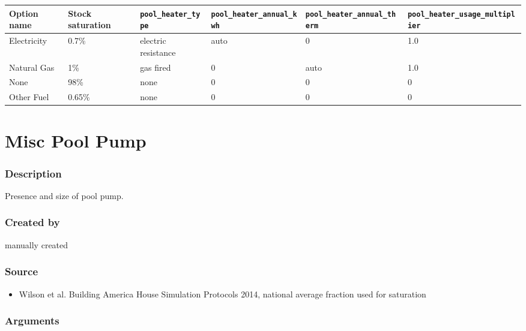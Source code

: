 \begin{longtable}[]{@{}llllll@{}}
\toprule\noalign{}
Option name & Stock saturation & \texttt{pool\_heater\_type} &
\texttt{pool\_heater\_annual\_kwh} &
\texttt{pool\_heater\_annual\_therm} &
\texttt{pool\_heater\_usage\_multiplier} \\
\midrule\noalign{}
\endhead
\bottomrule\noalign{}
\endlastfoot
Electricity & 0.7\% & electric resistance & auto & 0 & 1.0 \\
Natural Gas & 1\% & gas fired & 0 & auto & 1.0 \\
None & 98\% & none & 0 & 0 & 0 \\
Other Fuel & 0.65\% & none & 0 & 0 & 0 \\
\end{longtable}

\section{Misc Pool Pump}\label{misc_pool_pump}

\subsubsection{Description}\label{description-118}

Presence and size of pool pump.

\subsubsection{Created by}\label{created-by-119}

manually created

\subsubsection{Source}\label{source-121}

\begin{itemize}
 
\item
  Wilson et al. \textquotesingle Building America House Simulation
  Protocols\textquotesingle{} 2014, national average fraction used for
  saturation
\end{itemize}

\subsubsection{Arguments}\label{arguments-82}

